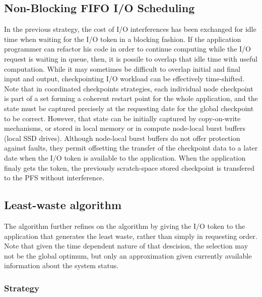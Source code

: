 \subsection{Non-Blocking FIFO I/O Scheduling}

In the previous strategy, the cost of I/O interferences has been
exchanged for idle time when waiting for the I/O token in a blocking
fashion. If the application programmer can refactor his code in order
to continue computing while the I/O request is waiting in queue,
then, it is possile to overlap that idle time with useful computation.
While it may sometimes be difficult to overlap initial and final input
and output, checkpointing I/O workload can be effectively time-shifted.
Note that in coordinated checkpoints strategies, each individual node
checkpoint is part of a set forming a coherent restart point for the
whole application, and the state must be captured precisely at the
requesting date for the global checkpoint to be correct. However, that
 state can be initially captured by copy-on-write mechanisms, or stored
in local memory or in compute node-local burst buffers (\eg local SSD
drives). Although node-local burst buffers do not offer protection
against faults, they permit offsetting the transfer of the checkpoint
data to a later date when the I/O token is available to the application.
When the application finaly gets the token, the previously scratch-space
stored checkpoint is transfered to the PFS without interference.

\subsection{Least-waste algorithm}

The \leastwaste algorithm further refines on the \fifononblock algorithm
by giving the I/O token to the application that generates the least
waste, rather than simply in requesting order. Note that given the time
dependent nature of that descision, the selection may
not be the global optimum, but only an approximation given currently
available information about the system status.



\subsubsection{Strategy}

